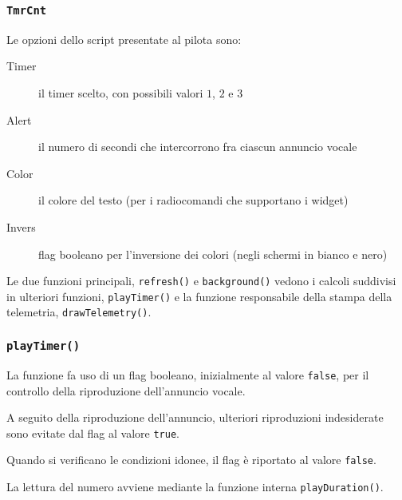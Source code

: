 \documentclass{beamer}
\begin{document}
\begin{frame}
        \frametitle{\texttt{TmrCnt}}
        Le opzioni dello script presentate al pilota sono:
        
        \begin{description}
                \item[Timer] il timer scelto, con possibili valori $1$, $2$ e $3$
        
                \item[Alert] il numero di secondi che intercorrono fra ciascun annuncio vocale
        
                \item[Color] il colore del testo (per i radiocomandi che supportano i widget)
        
                \item[Invers] flag booleano per l'inversione dei colori (negli schermi in bianco e nero)
        \end{description}
        
        Le due funzioni principali, \texttt{refresh()} e \texttt{background()} vedono i calcoli suddivisi in ulteriori funzioni, \texttt{playTimer()} e la funzione responsabile della stampa della telemetria, \texttt{drawTelemetry()}.\newline
\end{frame}

\begin{frame}
        \frametitle{\texttt{playTimer()}}
        La funzione fa uso di un flag booleano, inizialmente al valore \texttt{false}, per il controllo della riproduzione dell'annuncio vocale.\newline
        
        A seguito della riproduzione dell'annuncio, ulteriori riproduzioni indesiderate sono evitate dal flag al valore \texttt{true}.
        
        Quando si verificano le condizioni idonee, il flag è riportato al valore \texttt{false}.
        
        La lettura del numero avviene mediante la funzione interna \texttt{playDuration()}.
\end{frame}
\end{document}
